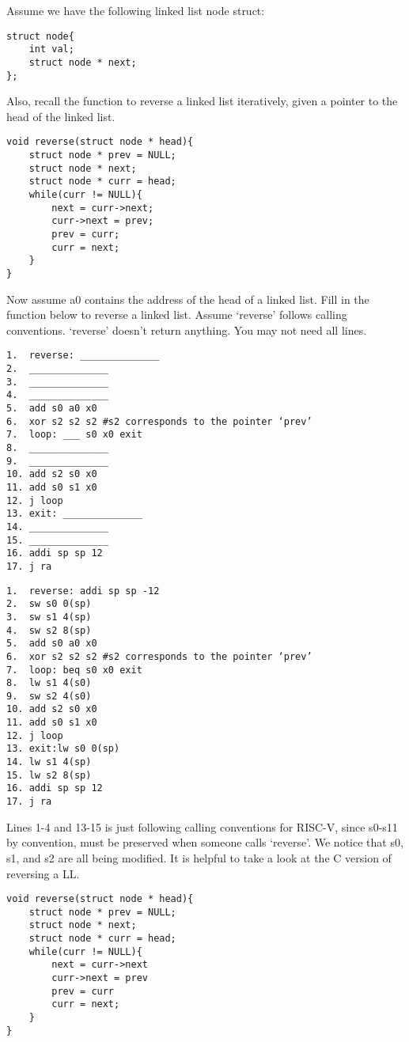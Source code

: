 \begin{blocksection}
\question
Assume we have the following linked list node struct:
\begin{verbatim}
struct node{
	int val;
	struct node * next;
};
\end{verbatim}

Also, recall the function to reverse a linked list iteratively, given a pointer to the head of the linked list. 
\begin{verbatim}
void reverse(struct node * head){
	struct node * prev = NULL; 
	struct node * next;
	struct node * curr = head;
	while(curr != NULL){
		next = curr->next; 
		curr->next = prev;
		prev = curr;
		curr = next; 
	}
}
\end{verbatim}

Now assume a0 contains the address of the head of a linked list.  Fill in the function 
below to reverse a linked list. Assume ‘reverse’ follows calling conventions. ‘reverse’ doesn’t return anything. You may not need all lines. 

\begin{verbatim}
1.  reverse: ______________
2.  ______________
3.  ______________
4.  ______________
5.  add s0 a0 x0 
6.  xor s2 s2 s2 #s2 corresponds to the pointer ‘prev’ 
7.  loop: ___ s0 x0 exit
8.  ______________
9.  ______________
10. add s2 s0 x0 
11. add s0 s1 x0 
12. j loop 
13. exit: ______________
14. ______________
15. ______________
16. addi sp sp 12
17. j ra
\end{verbatim}

\begin{solution}
\begin{verbatim}
1.  reverse: addi sp sp -12
2.  sw s0 0(sp) 
3.  sw s1 4(sp) 
4.  sw s2 8(sp) 
5.  add s0 a0 x0 
6.  xor s2 s2 s2 #s2 corresponds to the pointer ‘prev’ 
7.  loop: beq s0 x0 exit
8.  lw s1 4(s0)
9.  sw s2 4(s0)
10. add s2 s0 x0 
11. add s0 s1 x0 
12. j loop 
13. exit:lw s0 0(sp)
14. lw s1 4(sp)
15. lw s2 8(sp)
16. addi sp sp 12
17. j ra
\end{verbatim}

Lines 1-4 and 13-15 is just following calling conventions for RISC-V, since s0-s11 by convention, must be preserved when someone calls ‘reverse’. We notice that s0, s1, and s2 are all being modified. It is helpful to take a look at the C version of reversing a LL. 

\begin{verbatim}
void reverse(struct node * head){
	struct node * prev = NULL; 
	struct node * next;
	struct node * curr = head;
	while(curr != NULL){
		next = curr->next 
		curr->next = prev
		prev = curr
		curr = next;
	}
}
\end{verbatim}


\end{solution}
\end{blocksection}
